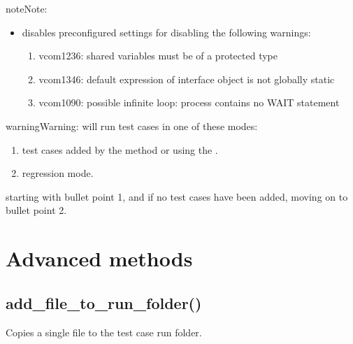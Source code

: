 \documentclass[letterpaper,10pt,english]{sphinxmanual}
\begin{document}
\begin{sphinxadmonition}{note}{Note:}
\begin{itemize}
\item {} 
\sphinxAtStartPar
{} disables preconfigured settings for disabling the following warnings:
\begin{enumerate}
%
\item {} 
\sphinxAtStartPar
vcom\sphinxhyphen{}1236: shared variables must be of a protected type

\item {} 
\sphinxAtStartPar
vcom\sphinxhyphen{}1346: default expression of interface object is not globally static

\item {} 
\sphinxAtStartPar
vcom\sphinxhyphen{}1090: possible infinite loop: process contains no WAIT statement

\end{enumerate}

\end{itemize}
\end{sphinxadmonition}

\begin{sphinxadmonition}{warning}{Warning:}
\sphinxAtStartPar
{} will run test cases in one of these modes:
\begin{enumerate}
%
\item {} 
\sphinxAtStartPar
test cases added by the {\hyperref[\detokenize{api:add-testcase}]{}} method or using the {\hyperref[\detokenize{cli::doc}]{}}.

\item {} 
\sphinxAtStartPar
regression mode.

\end{enumerate}

\sphinxAtStartPar
starting with bullet point 1, and if no test cases have been added, moving on to bullet point 2.
\end{sphinxadmonition}


\section{Advanced methods}
\label{\detokenize{api:advanced-methods}}

\subsection{add\_file\_to\_run\_folder()}
\label{\detokenize{api:add-file-to-run-folder}}
\sphinxAtStartPar
Copies a single file to the test case run folder.
\end{document}
